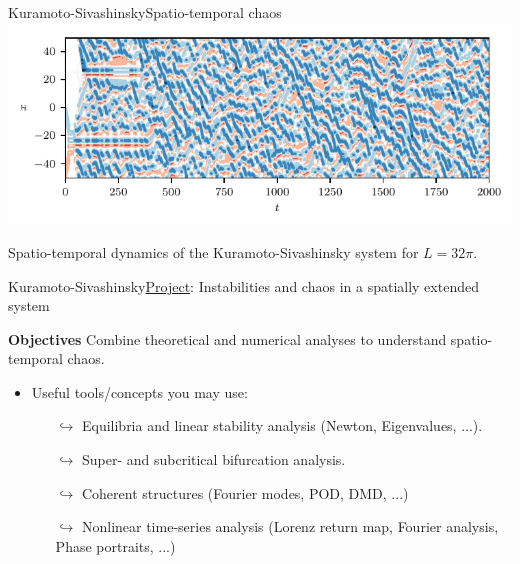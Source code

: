 \documentclass[usenames,dvipsnames,svgnames,10pt,aspectratio=169]{beamer}
\begin{document}
\begin{frame}[t, c]{Kuramoto-Sivashinsky}{Spatio-temporal chaos}
	\centering
	\includegraphics[width=.75\textwidth]{kuramoto_sivashinsky_spatio_temporal_chaos}

	Spatio-temporal dynamics of the Kuramoto-Sivashinsky system for $L = 32 \pi$.

	\vspace{1cm}
\end{frame}

\begin{frame}[t, c]{Kuramoto-Sivashinsky}{\underline{Project}: Instabilities and chaos in a spatially extended system}

	\begin{block}{\centering \textbf{Objectives}}
		\centering
		Combine theoretical and numerical analyses to understand spatio-temporal chaos.
	\end{block}

	\bigskip

	\begin{itemize}
		\item Useful tools/concepts you may use:
		\begin{itemize}
			\item[$\hookrightarrow$] Equilibria and linear stability analysis (Newton, Eigenvalues, ...).
			\item[$\hookrightarrow$] Super- and subcritical bifurcation analysis.
			\item[$\hookrightarrow$] Coherent structures (Fourier modes, POD, DMD, ...)
			\item[$\hookrightarrow$] Nonlinear time-series analysis (Lorenz return map, Fourier analysis, Phase portraits, ...)
		\end{itemize}
	\end{itemize}

	\vspace{1cm}
\end{frame}
\end{document}
